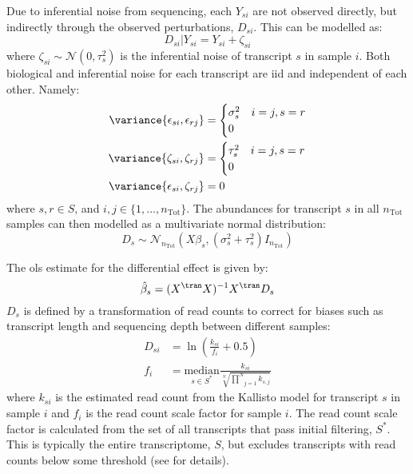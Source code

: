 Due to inferential noise from sequencing, each $Y_{si}$ are not observed directly, but indirectly through the observed perturbations, $D_{si}$.
This can be modelled as:
%
\begin{equation}
  D_{si} | Y_{si} = Y_{si} + \zeta_{si}
\end{equation}
%
where $\zeta_{si} \sim \mathcal{N}(0, \tau_s^2)$ is the inferential noise of transcript $s$ in sample $i$.
Both biological and inferential noise for each transcript are \gls{iid} and independent of each other.
Namely:
%
\begin{align}
  \variance{\epsilon_{si}, \epsilon_{rj}} & =
  \begin{cases}
    \sigma_s^2 & i = j, s = r \\
    0
  \end{cases}                     \\
  \variance{\zeta_{si}, \zeta_{rj}}       & =
  \begin{cases}
    \tau_s^2 & i = j, s = r \\
    0
  \end{cases}                     \\
  \variance{\epsilon_{si}, \zeta_{rj}}    & = 0
\end{align}
%
where $s, r \in S$, and $i, j \in \{1, ..., n_\mathrm{Tot} \}$.
The abundances for transcript $s$ in all $n_\mathrm{Tot}$ samples can then modelled as a multivariate normal distribution:
%
\begin{equation}
  D_{s} \sim \mathcal{N}_{n_\mathrm{Tot}}(X \beta_s, (\sigma_s^2 + \tau_s^2)I_{n_\mathrm{Tot}})
\end{equation}
%

The \gls{ols} estimate for the differential effect is given by:
%
\begin{equation}
  \hat{\beta}_s = (X^\tran X)^{-1} X^\tran D_s
\end{equation}
%
$D_s$ is defined by a transformation of read counts to correct for biases such as transcript length and sequencing depth between different samples:
%
\begin{align}
  D_{si}   & = \ln \left(\frac{k_{si}}{f_i} + 0.5 \right)                                                            \\
  f_i & = \underset{s \in S^*}{\mathrm{median}} \frac{k_{si}}{\sqrt[N]{\underset{j = 1}{\overset{N}{\prod }}k_{s,j}}}
\end{align}
%
where $k_{si}$ is the estimated read count from the Kallisto model \cite{brayNearoptimalProbabilisticRNAseq2016} for transcript $s$ in sample $i$ and $f_i$ is the read count scale factor for sample $i$.
The read count scale factor is calculated from the set of all transcripts that pass initial filtering, $S^*$.
This is typically the entire transcriptome, $S$, but excludes transcripts with read counts below some threshold (see \cite[REF][]{pimentelDifferentialAnalysisRNAseq2017} for details).

